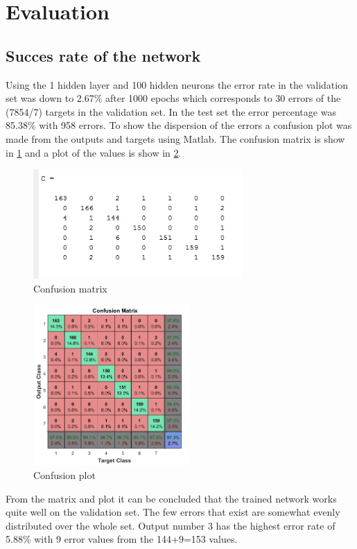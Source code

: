 \section{Evaluation} \label {chapter:evaluation}

\subsection{Succes rate of the network}
Using the 1 hidden layer and 100 hidden neurons the error rate in the validation set was down to 2.67\% after 1000 epochs which corresponds to 30 errors of the (7854/7) targets in the validation set. In the test set the error percentage was 85.38\% with 958 errors. To show the dispersion of the errors a confusion plot was made from the outputs and targets using Matlab. The confusion matrix is show in \cref{confusion_matrix} and a plot of the values is show in \cref{confusion_plot}. 


\begin{figure}[!h]
\begin{center}
\includegraphics[width=8cm]{testresults/confusionmatrix.png}
\caption{Confusion matrix}
\label{confusion_matrix}
\end{center}
\end{figure}
\FloatBarrier

\begin{figure}[!h]
\begin{center}
\includegraphics[width=6cm]{testresults/confusionplot.png}
\caption{Confusion plot}
\label{confusion_plot}
\end{center}
\end{figure}
\FloatBarrier

From the matrix and plot it can be concluded that the trained network works quite well on the validation set. The few errors that exist are somewhat evenly distributed over the whole set. Output number 3 has the highest error rate of 5.88\% with 9 error values from the 144+9=153 values.

